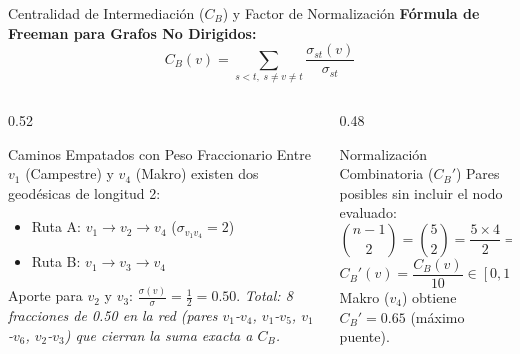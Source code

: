 \documentclass[aspectratio=169,10pt]{beamer}
\begin{document}
\begin{frame}{Centralidad de Intermediación ($C_B$) y Factor de Normalización}
    \textbf{Fórmula de Freeman para Grafos No Dirigidos:}
    $$C_B(v) = \sum_{s < t,\; s \neq v \neq t} \frac{\sigma_{st}(v)}{\sigma_{st}}$$

    \begin{columns}[T]
        \begin{column}{0.52\textwidth}
            \begin{block}{Caminos Empatados con Peso Fraccionario}
                Entre $v_1$ (Campestre) y $v_4$ (Makro) existen dos geodésicas de longitud 2:
                \begin{itemize}
                    \item Ruta A: $v_1 \to v_2 \to v_4$ \quad ($\sigma_{v_1 v_4} = 2$)
                    \item Ruta B: $v_1 \to v_3 \to v_4$
                \end{itemize}
                Aporte para $v_2$ y $v_3$: $\frac{\sigma(v)}{\sigma} = \frac{1}{2} = \mathbf{0.50}$.
                \vspace{0.1cm}
                \footnotesize \textit{Total: 8 fracciones de 0.50 en la red (pares $v_1$-$v_4$, $v_1$-$v_5$, $v_1$-$v_6$, $v_2$-$v_3$) que cierran la suma exacta a $C_B$.}
            \end{block}
        \end{column}
        \begin{column}{0.48\textwidth}
            \begin{block}{Normalización Combinatoria ($C_B'$)}
                Pares posibles sin incluir el nodo evaluado:
                $$\binom{n - 1}{2} = \binom{5}{2} = \frac{5 \times 4}{2} = \mathbf{10}$$
                $$C_B'(v) = \frac{C_B(v)}{10} \in [0, 1]$$
                Makro ($v_4$) obtiene $C_B'=0.65$ (máximo puente).
            \end{block}
        \end{column}
    \end{columns}
\end{frame}
\end{document}

